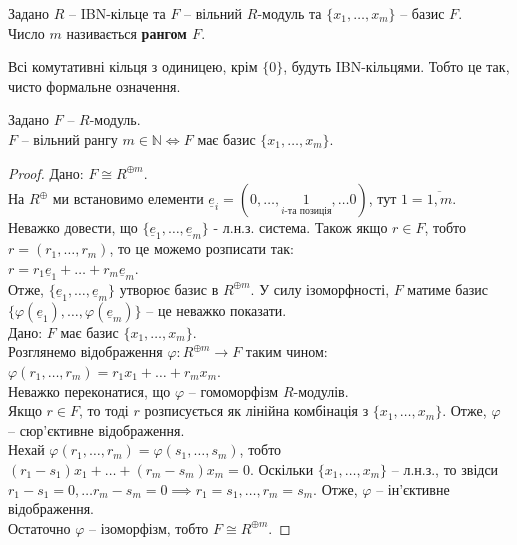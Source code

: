 \documentclass{math_library}
\begin{document}
\begin{definition}
Задано $R$ -- IBN-кільце та $F$ -- вільний $R$-модуль та $\{x_1,\dots,x_m\}$ -- базис $F$.\\
Число $m$ називається \textbf{рангом $F$}.
\end{definition}

\begin{remark}
Всі комутативні кільця з одиницею, крім $\{0\}$, будуть IBN-кільцями. Тобто це так, чисто формальне означення.
\end{remark}

\begin{proposition}
Задано $F$ -- $R$-модуль.\\
$F$ -- вільний рангу $m \in \mathbb{N} \iff F$ має базис $\{x_1,\dots,x_m\}$.
\end{proposition}

\begin{proof}
\rightproof Дано: $F \cong R^{\oplus m}$. \\
На $R^{\oplus}$ ми встановимо елементи $\underline{e}_i = (0,\dots,\underset{i\text{-та позиція}}{1}, \dots 0)$, тут $1 = \overline{1,m}$. Неважко довести, що $\{\underline{e}_1,\dots,\underline{e}_m\}$ - л.н.з. система. Також якщо $r \in F$, тобто $r = (r_1,\dots,r_m)$, то це можемо розписати так:\\
$r = r_1 \underline{e}_1 + \dots + r_m \underline{e}_m$.\\
Отже, $\{\underline{e}_1,\dots,\underline{e}_m\}$ утворює базис в $R^{\oplus m}$. У силу ізоморфності, $F$ матиме базис $\{\varphi(\underline{e}_1),\dots,\varphi(\underline{e}_m)\}$ -- це неважко показати.
\bigskip \\
\leftproof Дано: $F$ має базис $\{x_1,\dots,x_m\}$. \\
Розглянемо відображення $\varphi \colon R^{\oplus m} \to F$ таким чином:\\
$\varphi(r_1,\dots,r_m) = r_1x_1 + \dots + r_m x_m$.\\
Неважко переконатися, що $\varphi$ -- гомоморфізм $R$-модулів.\\
Якщо $r \in F$, то тоді $r$ розписується як лінійна комбінація з $\{x_1,\dots,x_m\}$. Отже, $\varphi$ -- сюр'єктивне відображення.\\
Нехай $\varphi(r_1,\dots,r_m) = \varphi(s_1,\dots,s_m)$, тобто $(r_1-s_1)x_1 + \dots + (r_m-s_m)x_m = 0$. Оскільки $\{x_1,\dots,x_m\}$ -- л.н.з., то звідси $r_1-s_1 = 0,\dots r_m-s_m=0 \implies r_1 = s_1, \dots, r_m = s_m$. Отже, $\varphi$ -- ін'єктивне відображення.\\
Остаточно $\varphi$ -- ізоморфізм, тобто $F \cong R^{\oplus m}$.
\end{proof}
\end{document}
